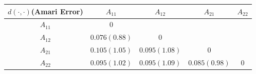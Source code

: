 \documentclass[fleqn]{article}
\begin{document}

\begin{table}
\centering
{}
\label{tab:similarity}
\begin{tabular}{c|cccc}
\hline
$d(\cdot,\cdot)$(Amari Error) & $A_{11}$&$A_{12}$ & $A_{21}$&$A_{22}$ \\
\hline
$A_{11}$ & $0$ &  &  &\\
$A_{12}$ & $\mathbf{0.076(0.88)}$& $0$ & &\\
$A_{21}$ & $0.105(1.05)$ & $0.095(1.08)$  & $0$ &\\
$A_{22}$ & $0.095(1.02)$ & $0.095(1.09)$ & $\mathbf{0.085(0.98)}$ & $0$ \\
\hline
\end{tabular}
\end{table}
\end{document}
